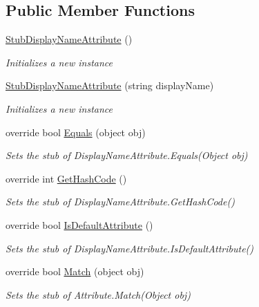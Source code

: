 \subsection*{Public Member Functions}
\begin{DoxyCompactItemize}
\item 
\hyperlink{class_system_1_1_component_model_1_1_fakes_1_1_stub_display_name_attribute_ad3f66ed204c3098063d9f0a118bc00ff}{Stub\-Display\-Name\-Attribute} ()
\begin{DoxyCompactList}\small\item\em Initializes a new instance\end{DoxyCompactList}\item 
\hyperlink{class_system_1_1_component_model_1_1_fakes_1_1_stub_display_name_attribute_a5a7eec7dca5e97af2fd564ce9526dbc4}{Stub\-Display\-Name\-Attribute} (string display\-Name)
\begin{DoxyCompactList}\small\item\em Initializes a new instance\end{DoxyCompactList}\item 
override bool \hyperlink{class_system_1_1_component_model_1_1_fakes_1_1_stub_display_name_attribute_ac11615dcd769bf20dbba0cbf2dc706b6}{Equals} (object obj)
\begin{DoxyCompactList}\small\item\em Sets the stub of Display\-Name\-Attribute.\-Equals(\-Object obj)\end{DoxyCompactList}\item 
override int \hyperlink{class_system_1_1_component_model_1_1_fakes_1_1_stub_display_name_attribute_a4d435ac415d74926644e5d2e97c6613c}{Get\-Hash\-Code} ()
\begin{DoxyCompactList}\small\item\em Sets the stub of Display\-Name\-Attribute.\-Get\-Hash\-Code()\end{DoxyCompactList}\item 
override bool \hyperlink{class_system_1_1_component_model_1_1_fakes_1_1_stub_display_name_attribute_a88c2ac3b72b874c2035c99d99ef8d6e6}{Is\-Default\-Attribute} ()
\begin{DoxyCompactList}\small\item\em Sets the stub of Display\-Name\-Attribute.\-Is\-Default\-Attribute()\end{DoxyCompactList}\item 
override bool \hyperlink{class_system_1_1_component_model_1_1_fakes_1_1_stub_display_name_attribute_a8dac8a2a9a9b99259111ac93cf7844a4}{Match} (object obj)
\begin{DoxyCompactList}\small\item\em Sets the stub of Attribute.\-Match(\-Object obj)\end{DoxyCompactList}\end{DoxyCompactItemize}
